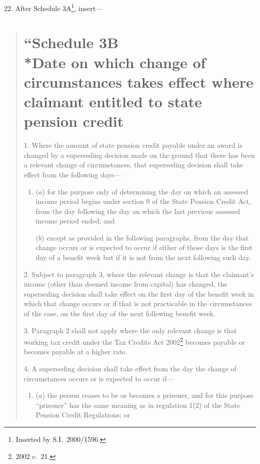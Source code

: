 \documentclass[12pt,a4paper]{article}
\begin{document}
22.  After Schedule 3A\footnote{Inserted by S.I.\ 2000/1596.}, insert—
\begin{quotation}\noindent\part*{“Schedule 3B\\*Date on which change of circumstances takes effect where claimant entitled to state pension credit}

1.  Where the amount of state pension credit payable under an award is changed by a superseding decision made on the ground that there has been a relevant change of circumstances, that superseding decision shall take effect from the following days—
\begin{enumerate}\item[]
($a$) for the purpose only of determining the day on which an assessed income period begins under section 9 of the State Pension Credit Act, from the day following the day on which the last previous assessed income period ended; and

($b$) except as provided in the following paragraphs, from the day that change occurs or is expected to occur if either of those days is the first day of a benefit week but if it is not from the next following such day.
\end{enumerate}

\medskip

2.  Subject to paragraph 3, where the relevant change is that the claimant’s income (other than deemed income from capital) has changed, the superseding decision shall take effect on the first day of the benefit week in which that change occurs or if that is not practicable in the circumstances of the case, on the first day of the next following benefit week.

\medskip

3.  Paragraph 2 shall not apply where the only relevant change is that working tax credit under the Tax Credits Act 2002\footnote{2002 c.\ 21.} becomes payable or becomes payable at a higher rate.

\medskip

4.  A superseding decision shall take effect from the day the change of circumstances occurs or is expected to occur if—
\begin{enumerate}\item[]
($a$) the person ceases to be or becomes a prisoner, and for this purpose “prisoner” has the same meaning as in regulation 1(2) of the State Pension Credit Regulations; or


\end{enumerate}
\end{quotation}
\end{document}
